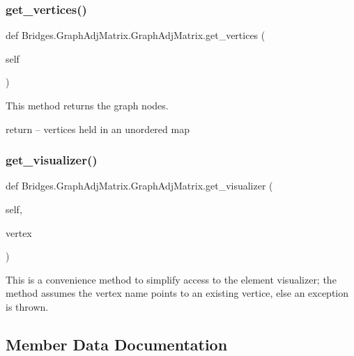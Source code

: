 \subsubsection{\texorpdfstring{get\+\_\+vertices()}{get\_vertices()}}
{\footnotesize\ttfamily def Bridges.\+Graph\+Adj\+Matrix.\+Graph\+Adj\+Matrix.\+get\+\_\+vertices (\begin{DoxyParamCaption}\item[{}]{self }\end{DoxyParamCaption})}



This method returns the graph nodes. 

return -- vertices held in an unordered map \mbox{\label{class_bridges_1_1_graph_adj_matrix_1_1_graph_adj_matrix_a2ac95314c1f3ac926d43c772e533c975}} 
\subsubsection{\texorpdfstring{get\+\_\+visualizer()}{get\_visualizer()}}
{\footnotesize\ttfamily def Bridges.\+Graph\+Adj\+Matrix.\+Graph\+Adj\+Matrix.\+get\+\_\+visualizer (\begin{DoxyParamCaption}\item[{}]{self,  }\item[{}]{vertex }\end{DoxyParamCaption})}



This is a convenience method to simplify access to the element visualizer; the method assumes the vertex name points to an existing vertice, else an exception is thrown. 



\subsection{Member Data Documentation}
\mbox{\label{class_bridges_1_1_graph_adj_matrix_1_1_graph_adj_matrix_a4d92a6f7675d067d79b39029a13a0372}} 
